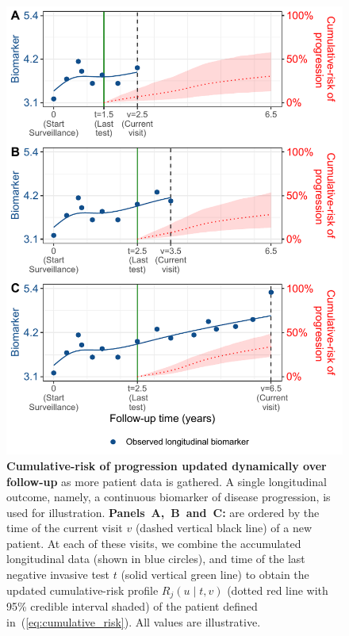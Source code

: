 \begin{figure}
\centerline{\includegraphics{images/dynrisk_plot_102.pdf}}
\caption{\small{\textbf{Cumulative-risk of progression updated dynamically over follow-up} as more patient data is gathered. A single longitudinal outcome, namely, a continuous biomarker of disease progression, is used for illustration. \textbf{Panels~A,~B~and~C:} are ordered by the time of the current visit $v$ (dashed vertical black line) of a new patient. At each of these visits, we combine the accumulated longitudinal data (shown in blue circles), and time of the last negative invasive test $t$ (solid vertical green line) to obtain the updated cumulative-risk profile $R_j(u \mid t, v)$ (dotted red line with 95\% credible interval shaded) of the patient defined in~(\ref{eq:cumulative_risk}). All values are illustrative.}}
\label{fig:dynrisk_explanation}
\end{figure}

